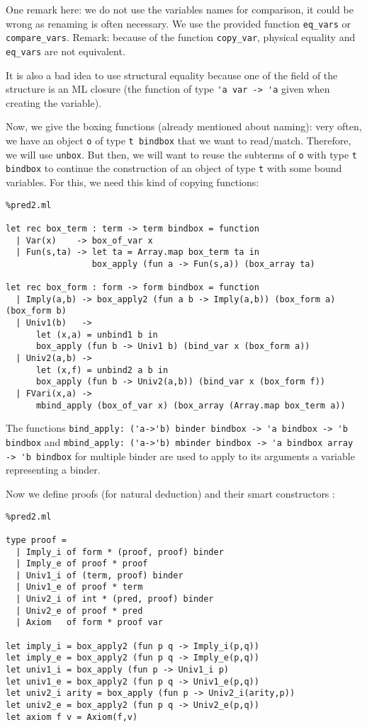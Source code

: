\documentclass[11pt]{article}
\begin{document}
One remark here: we do not use the variables names for comparison,
it could be wrong as renaming is often necessary. We use the
provided
function \verb#eq_vars# or \verb#compare_vars#.
Remark: because of the function \verb#copy_var#, physical equality
and \verb#eq_vars# are not equivalent.

It is also a bad idea to use structural equality because
one of the field of the structure is an ML
closure (the function of type \verb#'a var -> 'a# given when
creating the variable).

Now, we give the boxing functions (already mentioned about naming): very often, we have
an object \verb#o# of type \verb#t bindbox# that we want to
read/match. Therefore, we will use \verb#unbox#.
But then, we will want to reuse the subterms of \verb#o# with
type  \verb#t bindbox# to continue the construction of an object of
type \verb#t# with some bound variables. For this, we need this kind
of copying functions:

\begin{lstlisting}%pred2.ml

let rec box_term : term -> term bindbox = function
  | Var(x)    -> box_of_var x
  | Fun(s,ta) -> let ta = Array.map box_term ta in
                 box_apply (fun a -> Fun(s,a)) (box_array ta)

let rec box_form : form -> form bindbox = function
  | Imply(a,b) -> box_apply2 (fun a b -> Imply(a,b)) (box_form a) (box_form b)
  | Univ1(b)   ->
      let (x,a) = unbind1 b in
      box_apply (fun b -> Univ1 b) (bind_var x (box_form a))
  | Univ2(a,b) ->
      let (x,f) = unbind2 a b in
      box_apply (fun b -> Univ2(a,b)) (bind_var x (box_form f))
  | FVari(x,a) ->
      mbind_apply (box_of_var x) (box_array (Array.map box_term a))
\end{lstlisting}

The functions
\verb#bind_apply: ('a->'b) binder bindbox -> 'a bindbox -> 'b bindbox# and
\verb#mbind_apply: ('a->'b) mbinder bindbox -> 'a bindbox array -> 'b bindbox#
for multiple binder are
used to apply to its arguments a variable representing a binder.

Now we define proofs (for natural deduction) and their smart
constructors :
\begin{lstlisting}%pred2.ml

type proof =
  | Imply_i of form * (proof, proof) binder
  | Imply_e of proof * proof
  | Univ1_i of (term, proof) binder
  | Univ1_e of proof * term
  | Univ2_i of int * (pred, proof) binder
  | Univ2_e of proof * pred
  | Axiom   of form * proof var

let imply_i = box_apply2 (fun p q -> Imply_i(p,q))
let imply_e = box_apply2 (fun p q -> Imply_e(p,q))
let univ1_i = box_apply (fun p -> Univ1_i p)
let univ1_e = box_apply2 (fun p q -> Univ1_e(p,q))
let univ2_i arity = box_apply (fun p -> Univ2_i(arity,p))
let univ2_e = box_apply2 (fun p q -> Univ2_e(p,q))
let axiom f v = Axiom(f,v)
\end{lstlisting}
\end{document}
